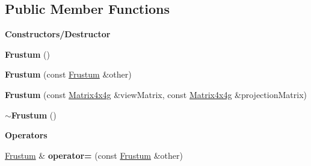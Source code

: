 \subsection*{Public Member Functions}
\begin{Indent}\textbf{ Constructors/\+Destructor}\par
\begin{DoxyCompactItemize}
\item 
\mbox{\label{classrev_1_1_frustum_a46036ed07cda5b0292b5e4ef1593d203}} 
{\bfseries Frustum} ()
\item 
\mbox{\label{classrev_1_1_frustum_a4acb13c8082523b3ff14f146adcaaa8e}} 
{\bfseries Frustum} (const \mbox{\hyperlink{classrev_1_1_frustum}{Frustum}} \&other)
\item 
\mbox{\label{classrev_1_1_frustum_ae9068ded6e700185a3639db9c9355afb}} 
{\bfseries Frustum} (const \mbox{\hyperlink{classrev_1_1_square_matrix}{Matrix4x4g}} \&view\+Matrix, const \mbox{\hyperlink{classrev_1_1_square_matrix}{Matrix4x4g}} \&projection\+Matrix)
\item 
\mbox{\label{classrev_1_1_frustum_aaf7b4403910d50e5556ed145d35e6070}} 
{\bfseries $\sim$\+Frustum} ()
\end{DoxyCompactItemize}
\end{Indent}
\begin{Indent}\textbf{ Operators}\par
\begin{DoxyCompactItemize}
\item 
\mbox{\label{classrev_1_1_frustum_a1b446b0cf297dd57b4975f8dbbfe83aa}} 
\mbox{\hyperlink{classrev_1_1_frustum}{Frustum}} \& {\bfseries operator=} (const \mbox{\hyperlink{classrev_1_1_frustum}{Frustum}} \&other)
\end{DoxyCompactItemize}
\end{Indent}
